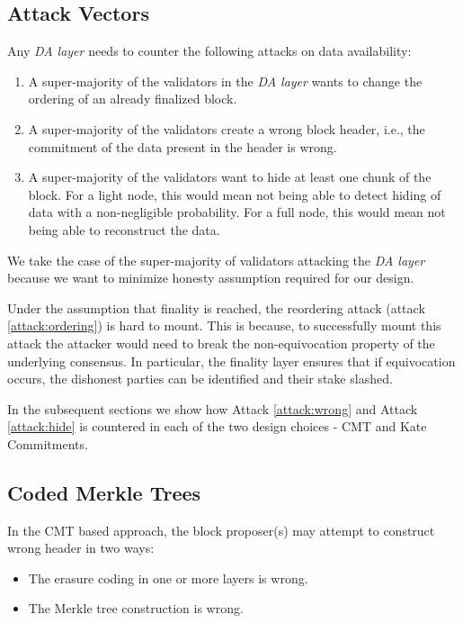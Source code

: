 \documentclass[sigconf, screen=true, nonacm]{acmart}
\newcommand{\DA}{\textit{DA layer}}
\begin{document}
    \subsection{Attack Vectors}
        Any \DA{} needs to counter the following attacks on data availability:
        \begin{enumerate}
            \item \label{attack:ordering} A super-majority of the validators in the \DA{} wants to change the ordering of an already finalized block.
            \item \label{attack:wrong} A super-majority of the validators create a wrong block header, i.e., the commitment of the data present in the header is wrong. 
            \item \label{attack:hide} A super-majority of the validators want to hide at least one chunk of the block. For a light node, this would mean not being able to detect hiding of data with a non-negligible probability. For a full node, this would mean not being able to reconstruct the data. 
        \end{enumerate}

        We take the case of the super-majority of validators attacking the \DA{} because we want to minimize honesty assumption required for our design. 
        
        Under the assumption that finality is reached, the reordering attack (attack \ref{attack:ordering}) is hard to mount. This is because, to successfully mount this attack the attacker would need to break the non-equivocation property of the underlying consensus. In particular, the finality layer ensures that if equivocation occurs, the dishonest parties can be identified and their stake slashed. 

        In the subsequent sections we show how Attack \ref{attack:wrong} and Attack \ref{attack:hide} is countered in each of the two design choices - CMT and Kate Commitments.

    \subsection{Coded Merkle Trees}
        In the CMT based approach, the block proposer(s) may attempt to construct wrong header in two ways:
        \begin{itemize}
            \item The erasure coding in one or more layers is wrong. 
            \item The Merkle tree construction is wrong.
        \end{itemize}
\end{document}
